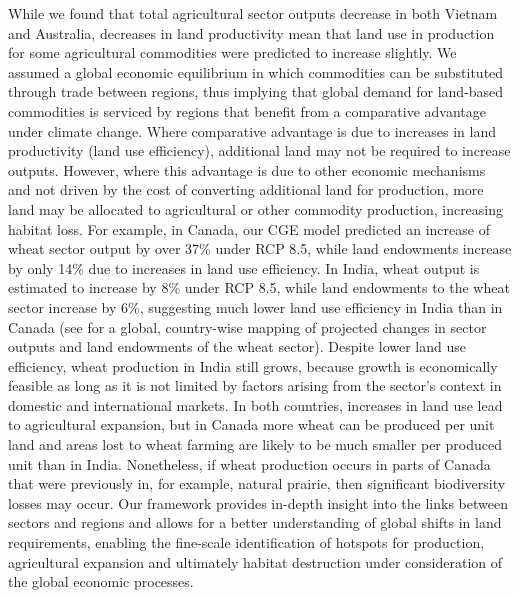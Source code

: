 \documentclass[titlesmallcaps,copyrightpage]{uomthesis}\usepackage[]{graphicx}\usepackage[]{color}
\begin{document}
While we found that total agricultural sector outputs decrease in both Vietnam and Australia, decreases in land productivity mean that land use in production for some agricultural commodities were predicted to increase slightly. We assumed a global economic equilibrium in which commodities can be substituted through trade between regions, thus implying that global demand for land-based commodities is serviced by regions that benefit from a comparative advantage under climate change. Where comparative advantage is due to increases in land productivity (land use efficiency), additional land may not be required to increase outputs. However, where this advantage is due to other economic mechanisms and not driven by the cost of converting additional land for production, more land may be allocated to agricultural or other commodity production, increasing habitat loss. For example, in Canada, our CGE model predicted an increase of wheat sector output by over 37\% under RCP 8.5, while land endowments increase by only 14\% due to increases in land use efficiency. In India, wheat output is estimated to increase by 8\% under RCP 8.5, while land endowments to the wheat sector increase by 6\%, suggesting much lower land use efficiency in India than in Canada (see  for a global, country-wise mapping of projected changes in sector outputs and land endowments of the wheat sector). Despite lower land use efficiency, wheat production in India still grows, because growth is economically feasible as long as it is not limited by factors arising from the sector’s context in domestic and international markets. In both countries, increases in land use lead to agricultural expansion, but in Canada more wheat can be produced per unit land and areas lost to wheat farming are likely to be much smaller per produced unit than in India. Nonetheless, if wheat production occurs in parts of Canada that were previously in, for example, natural prairie, then significant biodiversity losses may occur. Our framework provides in-depth insight into the links between sectors and regions and allows for a better understanding of global shifts in land requirements, enabling the fine-scale identification of hotspots for production, agricultural expansion and ultimately habitat destruction under consideration of the global economic processes.
\end{document}
